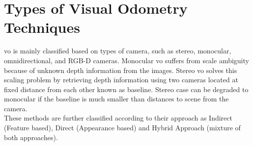 \section{Types of Visual Odometry Techniques}
\label{section:vo_types}
\acrshort{vo} is mainly classified based on types of camera, such as stereo, monocular, omnidirectional, and RGB-D cameras. Monocular \acrshort{vo} suffers from scale ambiguity because of unknown depth information from the images. Stereo \acrshort{vo} solves this scaling problem by retrieving depth information using two cameras located at fixed distance from each other known as baseline. Stereo case can be degraded to monocular if the baseline is much smaller than distances to scene from the camera.\\
\newline
These methods are further classified according to their approach as Indirect (Feature based), Direct (Appearance based) and Hybrid Approach (mixture of both approaches).

